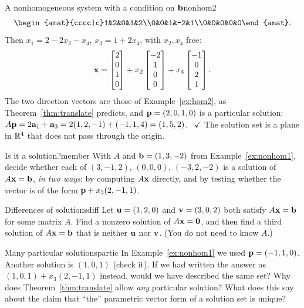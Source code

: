 \documentclass[11pt]{article}
\begin{document}
\begin{exmp}{A nonhomogeneous system with a condition on $\mathbf{b}$}{nonhom2}
\begin{align*}
\begin{amat}{cccc|c}1&2&0&1&2\\0&0&1&-2&1\\0&0&0&0&0\end{amat}.
\end{align*}
Then $x_1=2-2x_2-x_4$, $x_3=1+2x_4$, with $x_2,x_4$ free:
\[
\mathbf{x}=\begin{bmatrix}2\\0\\1\\0\end{bmatrix}+x_2\begin{bmatrix}-2\\1\\0\\0\end{bmatrix}+x_4\begin{bmatrix}-1\\0\\2\\1\end{bmatrix}.
\]
The two direction vectors are those of Example~\ref{ex:hom2}, as Theorem~\ref{thm:translate} predicts, and $\mathbf{p}=(2,0,1,0)$ is a particular solution: $A\mathbf{p}=2\mathbf{a}_1+\mathbf{a}_3=2(1,2,-1)+(-1,1,4)=(1,5,2)$. \ $\checkmark$
The solution set is a plane in $\mathbb{R}^4$ that does not pass through the origin.
\end{exmp}

\begin{kc}{Is it a solution?}{member}
With $A$ and $\mathbf{b}=(1,3,-2)$ from Example~\ref{ex:nonhom1}, decide whether each of $(3,-1,2)$, $(0,0,0)$, $(-3,2,-2)$ is a solution of $A\mathbf{x}=\mathbf{b}$, \emph{in two ways}: by computing $A\mathbf{x}$ directly, and by testing whether the vector is of the form $\mathbf{p}+x_3(2,-1,1)$.
\end{kc}

\begin{kc}{Differences of solutions}{diff}
Let $\mathbf{u}=(1,2,0)$ and $\mathbf{v}=(3,0,2)$ both satisfy $A\mathbf{x}=\mathbf{b}$ for some matrix $A$. Find a nonzero solution of $A\mathbf{x}=\mathbf{0}$, and then find a third solution of $A\mathbf{x}=\mathbf{b}$ that is neither $\mathbf{u}$ nor $\mathbf{v}$. (You do not need to know $A$.)
\end{kc}

\begin{think}{Many particular solutions}{partic}
In Example~\ref{ex:nonhom1} we used $\mathbf{p}=(-1,1,0)$. Another solution is $(1,0,1)$ (check it). If we had written the answer as $(1,0,1)+x_3(2,-1,1)$ instead, would we have described the same set? Why does Theorem~\ref{thm:translate} allow \emph{any} particular solution? What does this say about the claim that ``the'' parametric vector form of a solution set is unique?
\end{think}
\end{document}
